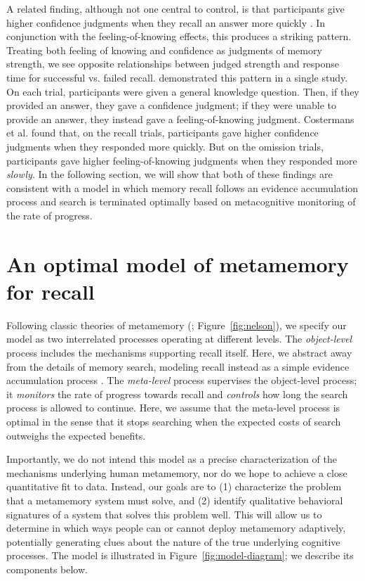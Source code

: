 A related finding, although not one central to control, is that participants give higher confidence judgments when they recall an answer more quickly \citepnelson{}. In conjunction with the feeling-of-knowing effects, this produces a striking pattern. Treating both feeling of knowing and confidence as judgments of memory strength, we see opposite relationships between judged strength and response time for successful vs. failed recall. \citet{costermans1992confidence} demonstrated this pattern in a single study. On each trial, participants were given a general knowledge question. Then, if they provided an answer, they gave a confidence judgment; if they were unable to provide an answer, they instead gave a feeling-of-knowing judgment. Costermans et al. found that, on the recall trials, participants gave higher confidence judgments when they responded more quickly. But on the omission trials, participants gave higher feeling-of-knowing judgments when they responded more \emph{slowly}. In the following section, we will show that both of these findings are consistent with a model in which memory recall follows an evidence accumulation process and search is terminated optimally based on metacognitive monitoring of the rate of progress.

\section{An optimal model of metamemory for recall}

Following classic theories of metamemory (\citealpnelson{}; Figure~\ref{fig:nelson}), we specify our model as two interrelated processes operating at different levels. The \emph{object-level} process includes the mechanisms supporting recall itself. Here, we abstract away from the details of memory search, modeling recall instead as a simple evidence accumulation process \citep{ratcliff2002estimating,sederberg2008context}. The \emph{meta-level} process supervises the object-level process; it \emph{monitors} the rate of progress towards recall and \emph{controls} how long the search process is allowed to continue. Here, we assume that the meta-level process is optimal in the sense that it stops searching when the expected costs of search outweighs the expected benefits.

Importantly, we do not intend this model as a precise characterization of the mechanisms underlying human metamemory, nor do we hope to achieve a close quantitative fit to data. Instead, our goals are to (1) characterize the problem that a metamemory system must solve, and (2) identify qualitative behavioral signatures of a system that solves this problem well. This will allow us to determine in which ways people can or cannot deploy metamemory adaptively, potentially generating clues about the nature of the true underlying cognitive processes. The model is illustrated in Figure~\ref{fig:model-diagram}; we describe its components below.


